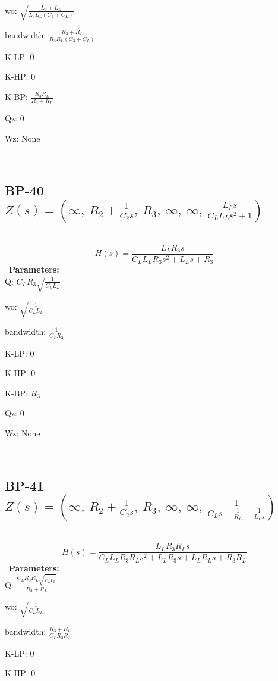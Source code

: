 \documentclass{article}
\begin{document}
wo: $\sqrt{\frac{L_{3} + L_{L}}{L_{3} L_{L} \left(C_{3} + C_{L}\right)}}$\ 

bandwidth: $\frac{R_{3} + R_{L}}{R_{3} R_{L} \left(C_{3} + C_{L}\right)}$\ 

K-LP: $0$\ 

K-HP: $0$\ 

K-BP: $\frac{R_{3} R_{L}}{R_{3} + R_{L}}$\ 

Qz: $0$\ 

Wz: $\text{None}$\ 

\ 

\subsection{BP-40 $Z(s) = \left( \infty, \  R_{2} + \frac{1}{C_{2} s}, \  R_{3}, \  \infty, \  \infty, \  \frac{L_{L} s}{C_{L} L_{L} s^{2} + 1}\right)$ } \ 
\textbf{\[H(s) = \frac{L_{L} R_{3} s}{C_{L} L_{L} R_{3} s^{2} + L_{L} s + R_{3}}\] } \ 
\textbf{Parameters:}\\ 

Q: $C_{L} R_{3} \sqrt{\frac{1}{C_{L} L_{L}}}$\ 

wo: $\sqrt{\frac{1}{C_{L} L_{L}}}$\ 

bandwidth: $\frac{1}{C_{L} R_{3}}$\ 

K-LP: $0$\ 

K-HP: $0$\ 

K-BP: $R_{3}$\ 

Qz: $0$\ 

Wz: $\text{None}$\ 

\ 

\subsection{BP-41 $Z(s) = \left( \infty, \  R_{2} + \frac{1}{C_{2} s}, \  R_{3}, \  \infty, \  \infty, \  \frac{1}{C_{L} s + \frac{1}{R_{L}} + \frac{1}{L_{L} s}}\right)$ } \ 
\textbf{\[H(s) = \frac{L_{L} R_{3} R_{L} s}{C_{L} L_{L} R_{3} R_{L} s^{2} + L_{L} R_{3} s + L_{L} R_{L} s + R_{3} R_{L}}\] } \ 
\textbf{Parameters:}\\ 

Q: $\frac{C_{L} R_{3} R_{L} \sqrt{\frac{1}{C_{L} L_{L}}}}{R_{3} + R_{L}}$\ 

wo: $\sqrt{\frac{1}{C_{L} L_{L}}}$\ 

bandwidth: $\frac{R_{3} + R_{L}}{C_{L} R_{3} R_{L}}$\ 

K-LP: $0$\ 

K-HP: $0$\ 
\end{document}
